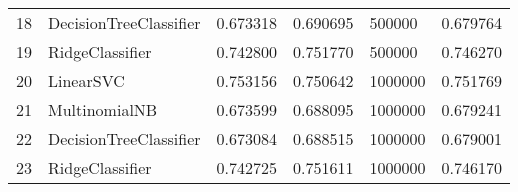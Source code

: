 \begin{tabular}{llrrlr}
18 &  DecisionTreeClassifier &  0.673318 &   0.690695 &       500000 &  0.679764 \\
19 &         RidgeClassifier &  0.742800 &   0.751770 &       500000 &  0.746270 \\
20 &               LinearSVC &  0.753156 &   0.750642 &      1000000 &  0.751769 \\
21 &           MultinomialNB &  0.673599 &   0.688095 &      1000000 &  0.679241 \\
22 &  DecisionTreeClassifier &  0.673084 &   0.688515 &      1000000 &  0.679001 \\
23 &         RidgeClassifier &  0.742725 &   0.751611 &      1000000 &  0.746170 \\
\bottomrule
\end{tabular}